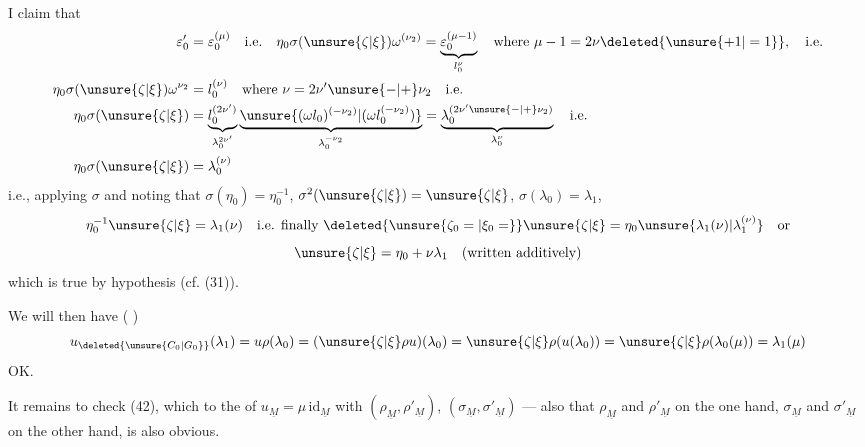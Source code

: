 
I claim that
\[
\begin{aligned}
\varepsilon'_0&=\varepsilon_0^{(\mu)}\quad\text{i.e.}\quad
\eta_0\sigma(\unsure{\zeta|\xi})\omega^{(\nu_2)}
 =\underbrace{\varepsilon_0^{(\mu-1)}}_{l_0^\nu}
\quad\text{where }\mu-1=2\nu\deleted{\unsure{+1|=1}},\quad\text{i.e.}\\
\eta_0\sigma(\unsure{\zeta|\xi})\omega^{\nu_2}&=l_0^{(\nu)}
\quad\text{where }\nu=2\nu'\unsure{-|+}\nu_2\quad\text{i.e.}\\
\eta_0\sigma(\unsure{\zeta|\xi})
 &=\underbrace{l_0^{(2\nu')}}_{\lambda_0^{2\nu'}}
 \underbrace{\unsure{(\omega l_0)^{(-\nu_2)}|(\omega l_0^{(-\nu_2)})}}_{\lambda_0^{-\nu_2}}
 =\underbrace{\lambda_0^{(2\nu'\unsure{-|+}\nu_2)}}_{\lambda_0^\nu}
 \quad\text{i.e.}\\
\eta_0\sigma(\unsure{\zeta|\xi})&=\lambda_0^{(\nu)}
\end{aligned}
\]
i.e., applying $\sigma$ and noting that
$\sigma(\eta_0)=\eta_0^{-1}$, $\sigma^2(\unsure{\zeta|\xi})=\unsure{\zeta|\xi}$,
$\sigma(\lambda_0)=\lambda_1$,
\[
\eta_0^{-1}\unsure{\zeta|\xi}=\lambda_1(\nu)
\quad\text{i.e. finally }\deleted{\unsure{\zeta_0=|\xi_0=}}
\unsure{\zeta|\xi}=\eta_0\unsure{\lambda_1(\nu)|\lambda_1^{(\nu)}}
\quad\text{or}
\]
\[
\unsure{\zeta|\xi}=\eta_0+\nu\lambda_1\quad\text{(written additively)}
\]
which is true by hypothesis (cf. (31)).

We will then have
(
)
\[
u_{\deleted{\unsure{C_0|G_0}}}(\lambda_1)
 =u\rho(\lambda_0)
 =(\unsure{\zeta|\xi}\rho u)(\lambda_0)
 =\unsure{\zeta|\xi}\rho(u(\lambda_0))
 =\unsure{\zeta|\xi}\rho(\lambda_0(\mu))
 =\lambda_1(\mu)
\]
OK.

It remains to check (42), which 
 to the  of
$u_{\underline M}=\mu\,\mathrm{id}_{\underline M}$ with
$(\rho_{\underline M},\rho'_{\underline M})$,
$(\sigma_{\underline M},\sigma'_{\underline M})$
---  also that
$\rho_{\underline M}$ and $\rho'_{\underline M}$ on the one hand,
$\sigma_{\underline M}$ and $\sigma'_{\underline M}$ on the other hand,
is also obvious.

